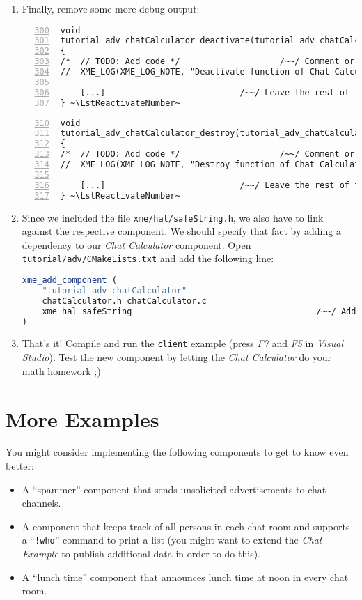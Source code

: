 \begin{enumerate}
	\item Finally, remove some more debug output:

\begin{lstlisting}[numbers=left,firstnumber=300]
void
tutorial_adv_chatCalculator_deactivate(tutorial_adv_chatCalculator_configStruct_t* config)
{
/*	// TODO: Add code */                    /~~/ Comment or remove this block
//	XME_LOG(XME_LOG_NOTE, "Deactivate function of Chat Calculator called!\n"); ~\LstSuppressNumber~

	[...]                           /~~/ Leave the rest of the function as-is
} ~\LstReactivateNumber~
\end{lstlisting}

\begin{lstlisting}[numbers=left,firstnumber=310]
void
tutorial_adv_chatCalculator_destroy(tutorial_adv_chatCalculator_configStruct_t* config)
{
/*	// TODO: Add code */                    /~~/ Comment or remove this block
//	XME_LOG(XME_LOG_NOTE, "Destroy function of Chat Calculator called!\n"); ~\LstSuppressNumber~

	[...]                           /~~/ Leave the rest of the function as-is
} ~\LstReactivateNumber~
\end{lstlisting}

	\item Since we included the file \verb|xme/hal/safeString.h|, we also have to link against the respective component.
		We should specify that fact by adding a dependency to our \emph{Chat Calculator} component.
		Open \verb|tutorial/adv/CMakeLists.txt| and add the following line:

\begin{lstlisting}[language=cmake,numbers=none]
xme_add_component (
	"tutorial_adv_chatCalculator"
	chatCalculator.h chatCalculator.c
	xme_hal_safeString                                     /~~/ Add this line
)
\end{lstlisting}

	\item That's it! Compile and run the \verb|client| example (press \emph{F7} and \emph{F5} in \emph{Visual Studio}).
		Test the new component by letting the \emph{Chat Calculator} do your math homework ;)
\end{enumerate}

\section{More Examples}

You might consider implementing the following components to get to know \xme even better:
\begin{itemize}
	\item A ``spammer'' component that sends unsolicited advertisements to chat channels.
	\item A component that keeps track of all persons in each chat room and supports a ``\verb|!who|'' command to print a list
		(you might want to extend the \emph{Chat Example} to publish additional data in order to do this).
	\item A ``lunch time'' component that announces lunch time at noon in every chat room.
\end{itemize}
